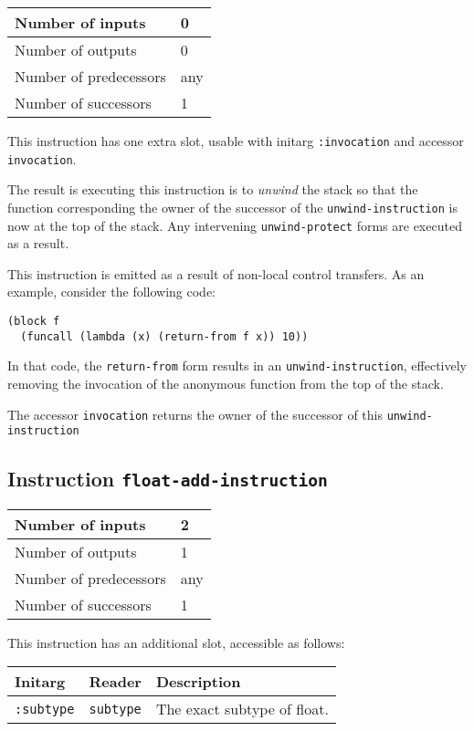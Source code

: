 \begin{tabular}{|l|l|}
\hline
Number of inputs & 0\\
\hline
Number of outputs & 0\\
\hline
Number of predecessors & any\\
\hline
Number of successors & 1\\
\hline
\end{tabular}

This instruction has one extra slot, usable with initarg
\texttt{:invocation} and accessor \texttt{invocation}.

The result is executing this instruction is to \emph{unwind} the stack
so that the function corresponding the owner of the successor of the
\texttt{unwind-instruction} is now at the top of the stack.  Any
intervening \texttt{unwind-protect} forms are executed as a result.

This instruction is emitted as a result of non-local control
transfers.  As an example, consider the following code:

\begin{verbatim}
(block f
  (funcall (lambda (x) (return-from f x)) 10))
\end{verbatim}

In that code, the \texttt{return-from} form results in an
\texttt{unwind-instruction}, effectively removing the invocation of
the anonymous function from the top of the stack.

The accessor \texttt{invocation} returns the owner of the successor of
this \texttt{unwind-instruction}

\subsection{Instruction \texttt{float-add-instruction}}
\label{hir-instruction-float-add}

\begin{tabular}{|l|l|}
\hline
Number of inputs & 2\\
\hline
Number of outputs & 1\\
\hline
Number of predecessors & any\\
\hline
Number of successors & 1\\
\hline
\end{tabular}

This instruction has an additional slot, accessible as follows:

\begin{tabular}{|l|l|l|}
  \hline
  Initarg & Reader & Description\\
  \hline\hline
  \texttt{:subtype} & \texttt{subtype} & The exact subtype of float.\\
  \hline
\end{tabular}


